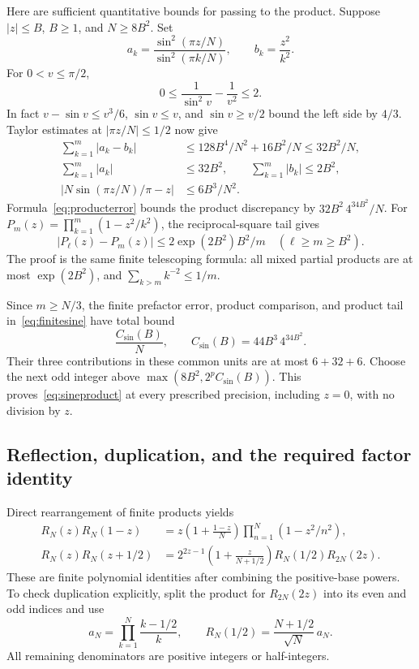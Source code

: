 \documentclass[11pt,letterpaper]{article}
\numberwithin{equation}{section}
\theoremstyle{definition}
\newcommand{\gamrec}{R}
\begin{document}
Here are sufficient quantitative bounds for passing to the product.
Suppose \(|z|\le B\), \(B\ge1\), and \(N\ge8B^2\). Set
\[
 a_k=\frac{\sin^2(\pi z/N)}{\sin^2(\pi k/N)},\qquad
 b_k=\frac{z^2}{k^2}.
\]
For \(0<v\le\pi/2\),
\[
 0\le\frac1{\sin^2v}-\frac1{v^2}\le2.
\]
In fact \(v-\sin v\le v^3/6\), \(\sin v\le v\), and
\(\sin v\ge v/2\) bound the left side by \(4/3\).
Taylor estimates at \(|\pi z/N|\le1/2\) now give
\begin{align}
 \sum_{k=1}^m|a_k-b_k|
     &\le128B^4/N^2+16B^2/N\le32B^2/N,\\
 \sum_{k=1}^m|a_k|&\le32B^2,\qquad
 \sum_{k=1}^m|b_k|\le2B^2,\\
 |N\sin(\pi z/N)/\pi-z|&\le6B^3/N^2.
 \label{eq:sinebounds}
\end{align}
Formula~\eqref{eq:producterror} bounds the product discrepancy by
\(32B^2\,4^{34B^2}/N\).
For \(P_m(z)=\prod_{k=1}^m(1-z^2/k^2)\), the reciprocal-square
tail gives
\[
 |P_\ell(z)-P_m(z)|
          \le2\exp(2B^2)B^2/m\quad(\ell\ge m\ge B^2).
\]
The proof is the same finite telescoping formula: all mixed partial
products are at most \(\exp(2B^2)\), and
\(\sum_{k>m}k^{-2}\le1/m\).

Since \(m\ge N/3\), the finite prefactor error, product comparison,
and product tail in~\eqref{eq:finitesine} have total bound
\begin{equation}
                  \frac{C_{\sin}(B)}{N},\qquad
 C_{\sin}(B)=44B^3\,4^{34B^2}.                            \label{eq:sinemodulus}
\end{equation}
Their three contributions in these common units are at most
\(6+32+6\). Choose the next odd integer above
\(\max(8B^2,2^pC_{\sin}(B))\).
This proves~\eqref{eq:sineproduct} at every prescribed precision,
including \(z=0\), with no division by \(z\).

\subsection{Reflection, duplication, and the required factor identity}

Direct rearrangement of finite products yields
\begin{align}
 \gamrec_N(z)\gamrec_N(1-z)
 &=z\left(1+\frac{1-z}{N}\right)
               \prod_{n=1}^N(1-z^2/n^2),                 \label{eq:finiteReflection}\\
 \gamrec_N(z)\gamrec_N(z+1/2)
 &=2^{2z-1}\left(1+\frac{z}{N+1/2}\right)
                    \gamrec_N(1/2)\gamrec_{2N}(2z).
 \label{eq:finiteDuplication}
\end{align}
These are finite polynomial identities after combining the
positive-base powers. To check duplication explicitly, split the
product for \(\gamrec_{2N}(2z)\) into its even and odd indices
and use
\[
 a_N=\prod_{k=1}^N\frac{k-1/2}{k},\qquad
 \gamrec_N(1/2)=\frac{N+1/2}{\sqrt N}\,a_N.
\]
All remaining denominators are positive integers or half-integers.
\end{document}

